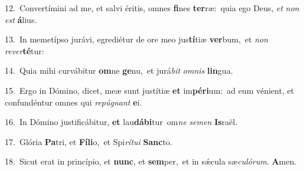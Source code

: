 {\numbfont\textcolor{\numbcolor}{12.}}~Convertímini ad me, et salvi éritis, omnes \textbf{fi}\-nes \textbf{ter}\-ræ:~\star quia ego Deus, \textit{et} \textit{non} \textit{est} \textbf{á}\-lius.\par
{\numbfont\textcolor{\numbcolor}{13.}}~In memetípso jurávi, egrediétur de ore meo jus\-\textbf{tí}\-tiæ \textbf{ver}\-bum,~\star et \textit{non} \textit{re}\-\textit{ver}\textbf{té}tur:\par
{\numbfont\textcolor{\numbcolor}{14.}}~Quia mihi curvábitur \textbf{om}\-ne \textbf{ge}\-nu,~\star et jurá\textit{bit} \textit{om}\-\textit{nis} \textbf{lin}\-gua.\par
{\numbfont\textcolor{\numbcolor}{15.}}~Ergo in Dómino, dicet, meæ sunt justítiæ \textbf{et} im\-\textbf{pé}\-\textbf{ri}um:~\star ad eum vénient, et confundéntur omnes qui \textit{re}\-\textit{pú}\textit{gnant} \textbf{e}\-i.\par
{\numbfont\textcolor{\numbcolor}{16.}}~In Dómino justificábitur, \textbf{et} lau\-\textbf{dá}\-\textbf{bi}tur~\star om\textit{ne} \textit{se}\-\textit{men} \textbf{Is}\-raël.\par
{\numbfont\textcolor{\numbcolor}{17.}}~Glória \textbf{Pa}\-tri, et \textbf{Fí}\-\textbf{li}o,~\star et Spi\-\textit{rí}\-\textit{tu}\textit{i} \textbf{Sanc}\-to.\par
{\numbfont\textcolor{\numbcolor}{18.}}~Sicut erat in princípio, et \textbf{nunc}\-, et \textbf{sem}\-per,~\star et in sǽcula sæ\-\textit{cu}\-\textit{ló}\textit{rum}. \textbf{A}\-men.\par
